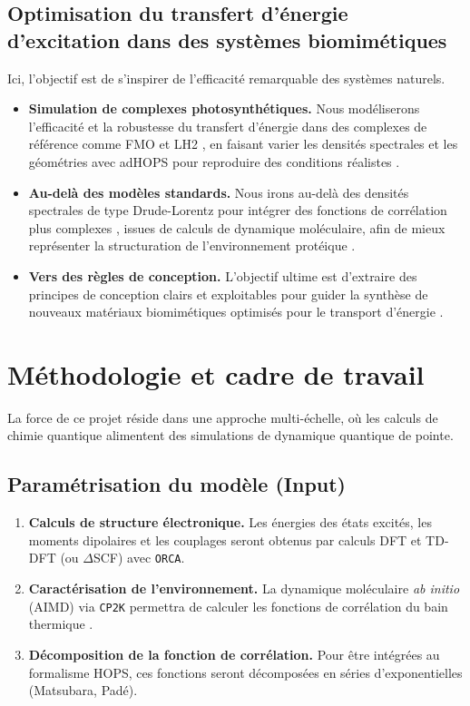 \documentclass[12pt, a4paper]{article}
\begin{document}
\subsection{Optimisation du transfert d'énergie d'excitation dans des systèmes biomimétiques}
Ici, l'objectif est de s'inspirer de l'efficacité remarquable des systèmes naturels.
\begin{itemize}
    \item \textbf{Simulation de complexes photosynthétiques.} Nous modéliserons l'efficacité et la robustesse du transfert d'énergie dans des complexes de référence comme FMO et LH2 \cite{wang2018, Harush2023, Pal2025}, en faisant varier les densités spectrales et les géométries avec adHOPS pour reproduire des conditions réalistes \cite{Zhang2021}.

    \item \textbf{Au-delà des modèles standards.} Nous irons au-delà des densités spectrales de type Drude-Lorentz pour intégrer des fonctions de corrélation plus complexes \cite{rangel2002}, issues de calculs de dynamique moléculaire, afin de mieux représenter la structuration de l'environnement protéique \cite{lambert2023}.

    \item \textbf{Vers des règles de conception.} L'objectif ultime est d'extraire des principes de conception clairs et exploitables pour guider la synthèse de nouveaux matériaux biomimétiques optimisés pour le transport d'énergie \cite{Gauger2024, Peter2024}.
\end{itemize}

\section{Méthodologie et cadre de travail}

La force de ce projet réside dans une approche multi-échelle, où les calculs de chimie quantique alimentent des simulations de dynamique quantique de pointe.

\subsection{Paramétrisation du modèle (Input)}

\begin{enumerate}
    \item \textbf{Calculs de structure électronique.} Les énergies des états excités, les moments dipolaires et les couplages seront obtenus par calculs DFT et TD-DFT (ou $\Delta$SCF) avec \texttt{ORCA}.

    \item \textbf{Caractérisation de l'environnement.} La dynamique moléculaire \textit{ab initio} (AIMD) via \texttt{CP2K} permettra de calculer les fonctions de corrélation du bain thermique \cite{lee2015}.

    \item \textbf{Décomposition de la fonction de corrélation.} Pour être intégrées au formalisme HOPS, ces fonctions seront décomposées en séries d'exponentielles (Matsubara, Padé).
\end{enumerate}
\end{document}
